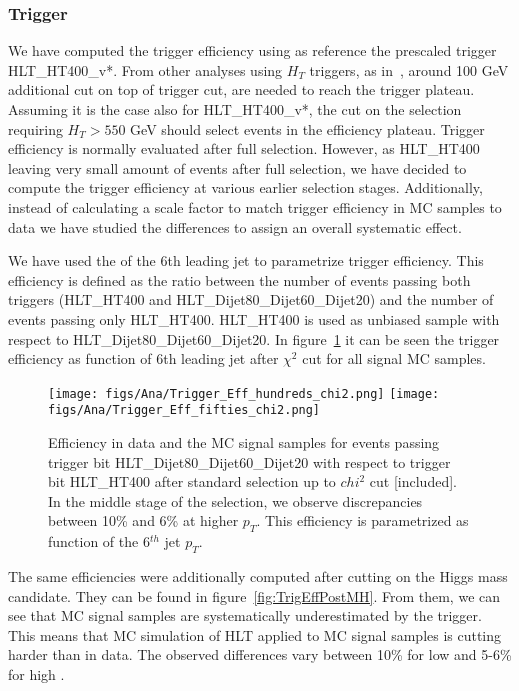 \subsubsection{Trigger}
\label{sec:trigger_ana}

We have computed the trigger efficiency using as reference the prescaled trigger HLT\_HT400\_v*. From other analyses using $H_{T}$ triggers, as in~\cite{Khachatryan:2015axa}, around 100 GeV additional cut on top of trigger cut, are needed to reach the trigger plateau. Assuming it is the case also for HLT\_HT400\_v*, the cut on the selection requiring $H_{T}>550$ GeV should select events in the efficiency plateau. Trigger efficiency is normally evaluated after full selection. However, as HLT\_HT400 leaving very small amount of events after full selection, we have decided to compute the trigger efficiency at various earlier selection stages. Additionally, instead of calculating a scale factor to match trigger efficiency in MC samples to data we have studied the differences to assign an overall systematic effect. 

We have used the \pt of the 6th leading jet to parametrize trigger efficiency. This efficiency is defined as the ratio between the number of events passing both triggers (HLT\_HT400 and HLT\_Dijet80\_Dijet60\_Dijet20) and the number of events passing only HLT\_HT400. HLT\_HT400 is used as unbiased sample with respect to HLT\_Dijet80\_Dijet60\_Dijet20. In figure~\ref{fig:TrigEff} it can be seen the trigger efficiency as function of 6th leading jet \pt after $\chi^{2}$ cut for all signal MC samples. 

\begin{figure}[!Hhtbp]
  \begin{center}
    \texttt{[image: figs/Ana/Trigger\_Eff\_hundreds\_chi2.png]}
    \texttt{[image: figs/Ana/Trigger\_Eff\_fifties\_chi2.png]}
    \caption{Efficiency in data and the MC signal samples for events passing trigger bit HLT\_Dijet80\_Dijet60\_Dijet20 with respect to trigger bit HLT\_HT400 after standard selection up to $chi^{2}$ cut [included]. In the middle stage of the selection, we observe discrepancies between 10\% and 6\% at higher $p_{T}$. This efficiency is parametrized as function of the 6$^{th}$ jet $p_{T}$.}
    \label{fig:TrigEff}
  \end{center}
\end{figure}

The same efficiencies were additionally computed after cutting on the Higgs mass candidate. They can be found in figure~\ref{fig:TrigEffPostMH}. From them, we can see that MC signal samples are systematically underestimated by the trigger. This means that MC simulation of HLT applied to MC signal samples is cutting harder than in data. The observed differences vary between 10\% for low \pt and 5-6\% for high \pt.

